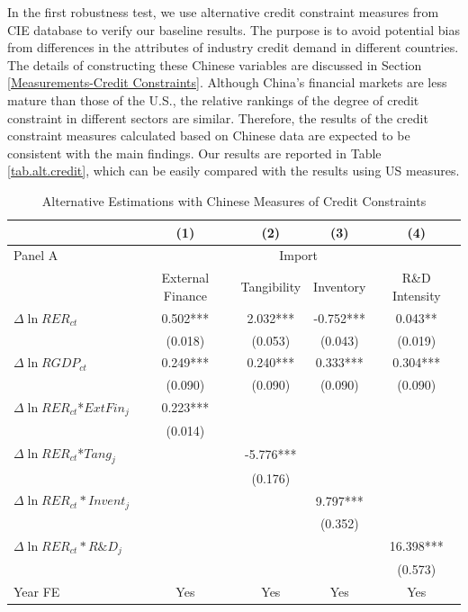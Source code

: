 \documentclass[12pt]{article}
\begin{document}
In the first robustness test, we use alternative credit constraint measures from CIE database to verify our baseline results. The purpose is to avoid potential bias from differences in the attributes of industry credit demand in different countries. The details of constructing these Chinese variables are discussed in Section \ref{Measurements-Credit Constraints}. Although China's financial markets are less mature than those of the U.S., the relative rankings of the degree of credit constraint in different sectors are similar. Therefore, the results of the credit constraint measures calculated based on Chinese data are expected to be consistent with the main findings. Our results are reported in Table \ref{tab.alt.credit}, which can be easily compared with the results using US measures.

\begin{table}[htbp]
	\centering
	\caption{Alternative Estimations with Chinese Measures of Credit Constraints}
	\begin{threeparttable}
	\begin{tabular}{lcccc}
		\toprule
		& (1)   & (2)   & (3)   & (4) \\
		\midrule
		Panel A & \multicolumn{4}{c}{Import} \\
		& External Finance & Tangibility & Inventory & R\&D Intensity \\
		\midrule
		$\Delta \ln RER_{ct}$ & 0.502*** & 2.032*** & -0.752*** & 0.043** \\
		& (0.018) & (0.053) & (0.043) & (0.019) \\
		$\Delta \ln RGDP_{ct}$ & 0.249*** & 0.240*** & 0.333*** & 0.304*** \\
		& (0.090) & (0.090) & (0.090) & (0.090) \\
		$\Delta \ln RER_{ct}$*$ExtFin_{j}$ & 0.223*** &       &       &  \\
		& (0.014) &       &       &  \\
		$\Delta \ln RER_{ct}$*$Tang_{j}$ &       & -5.776*** &       &  \\
		&       & (0.176) &       &  \\
		$\Delta \ln RER_{ct}*Invent_{j}$ &       &       & 9.797*** &  \\
		&       &       & (0.352) &  \\
		$\Delta \ln RER_{ct}*R\&D_{j}$ &       &       &       & 16.398*** \\
		&       &       &       & (0.573) \\
		Year FE  & Yes   & Yes   & Yes   & Yes \\

\end{tabular}
\end{threeparttable}
\end{table}
\end{document}
